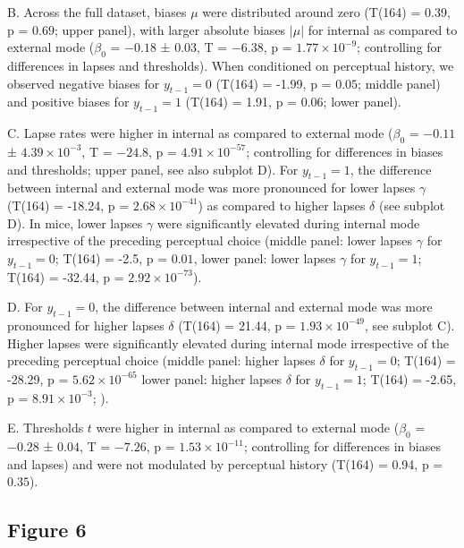 \documentclass[
]{article}
\begin{document}
B. Across the full dataset, biases \(\mu\) were distributed around zero
(T(164) = 0.39, p = \(0.69\); upper panel), with larger absolute biases
\(|\mu|\) for internal as compared to external mode (\(\beta_0\) =
\(-0.18\) ± \(0.03\), T = \(-6.38\), p =
\(\ensuremath{1.77\times 10^{-9}}\); controlling for differences in
lapses and thresholds). When conditioned on perceptual history, we
observed negative biases for \(y_{t-1} = 0\) (T(164) = -1.99, p =
\(0.05\); middle panel) and positive biases for \(y_{t-1} = 1\) (T(164)
= 1.91, p = \(0.06\); lower panel).

C. Lapse rates were higher in internal as compared to external mode
(\(\beta_0\) = \(-0.11\) ± \(\ensuremath{4.39\times 10^{-3}}\), T =
\(-24.8\), p = \(\ensuremath{4.91\times 10^{-57}}\); controlling for
differences in biases and thresholds; upper panel, see also subplot D).
For \(y_{t-1} = 1\), the difference between internal and external mode
was more pronounced for lower lapses \(\gamma\) (T(164) = -18.24, p =
\(\ensuremath{2.68\times 10^{-41}}\)) as compared to higher lapses
\(\delta\) (see subplot D). In mice, lower lapses \(\gamma\) were
significantly elevated during internal mode irrespective of the
preceding perceptual choice (middle panel: lower lapses \(\gamma\) for
\(y_{t-1} = 0\); T(164) = -2.5, p = \(0.01\), lower panel: lower lapses
\(\gamma\) for \(y_{t-1} = 1\); T(164) = -32.44, p =
\(\ensuremath{2.92\times 10^{-73}}\)).

D. For \(y_{t-1} = 0\), the difference between internal and external
mode was more pronounced for higher lapses \(\delta\) (T(164) = 21.44, p
= \(\ensuremath{1.93\times 10^{-49}}\), see subplot C). Higher lapses
were significantly elevated during internal mode irrespective of the
preceding perceptual choice (middle panel: higher lapses \(\delta\) for
\(y_{t-1} = 0\); T(164) = -28.29, p =
\(\ensuremath{5.62\times 10^{-65}}\) lower panel: higher lapses
\(\delta\) for \(y_{t-1} = 1\); T(164) = -2.65, p =
\(\ensuremath{8.91\times 10^{-3}}\); ).

E. Thresholds \(t\) were higher in internal as compared to external mode
(\(\beta_0\) = \(-0.28\) ± \(0.04\), T = \(-7.26\), p =
\(\ensuremath{1.53\times 10^{-11}}\); controlling for differences in
biases and lapses) and were not modulated by perceptual history (T(164)
= 0.94, p = \(0.35\)).

\newpage

\hypertarget{figure-6}{%
\subsection{Figure 6}\label{figure-6}}
\end{document}
